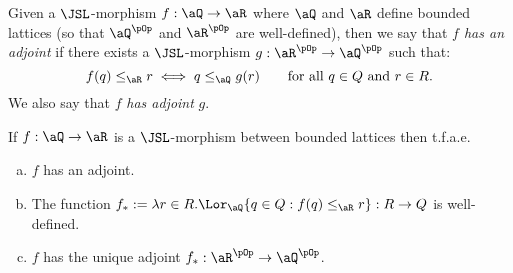 \documentclass{article}
\begin{document}
\begin{definition}
\label{def:jsl_adjoints_infinite_case}
\item
Given a $\JSL$-morphism $f : \aQ \to \aR$ where $\aQ$ and $\aR$ define bounded lattices (so that $\aQ^{\pOp}$ and $\aR^{\pOp}$ are well-defined), then we say that \emph{$f$ has an adjoint} if there exists a $\JSL$-morphism $g : \aR^{\pOp} \to \aQ^{\pOp}$ such that:
\[
f(q) \leq_\aR r \iff q \leq_\aQ g(r)
\qquad
\text{for all $q \in Q$ and $r \in R$}.
\]
We also say that $f$ \emph{has adjoint} $g$. \endbox
\end{definition}

\begin{lemma}
\label{lem:jsl_adjoints_infinite_case}
If $f : \aQ \to \aR$ is a $\JSL$-morphism between bounded lattices then t.f.a.e.\
\begin{enumerate}[(a)]
\item
$f$ has an adjoint.
\item
The function $f_* := \lambda r \in R. \Lor_\aQ \{ q \in Q : f(q) \leq_\aR r \} : R \to Q$ is well-defined.

\item
$f$ has the unique adjoint $f_* : \aR^{\pOp} \to \aQ^{\pOp}$.

\end{enumerate}
\end{lemma}
\end{document}
